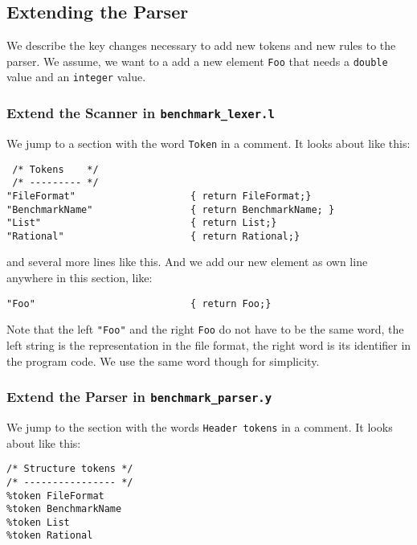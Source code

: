 \subsection{Extending the Parser\label{extendall}}

We describe the key changes necessary to add new tokens and new rules
to the parser. We assume, we want to a add a new element \texttt{Foo}
that needs a \texttt{double} value and an \texttt{integer} value.

\subsubsection{Extend the Scanner in \texttt{benchmark\_lexer.l}}

We jump to a section with the word \texttt{Token} in a comment. It
looks about like this:

\begin{verbatim}
 /* Tokens    */
 /* --------- */
"FileFormat"                    { return FileFormat;}
"BenchmarkName"                 { return BenchmarkName; }
"List"                          { return List;}
"Rational"                      { return Rational;}
\end{verbatim}

\noindent
and several more lines like this. And we add our new element as own
line anywhere in this section, like:

\begin{verbatim}
"Foo"                           { return Foo;}
\end{verbatim}

\noindent
Note that the left \texttt{"Foo"} and the right \texttt{Foo} do not
have to be the same word, the left string is the representation in the
file format, the right word is its identifier in the program code. We
use the same word though for simplicity.

\subsubsection{Extend the Parser in \texttt{benchmark\_parser.y}}
\label{extend}
We jump to the section with the words \texttt{Header tokens} in a
comment. It looks about like this:

\begin{verbatim}
/* Structure tokens */
/* ---------------- */
%token FileFormat
%token BenchmarkName
%token List
%token Rational
\end{verbatim}

